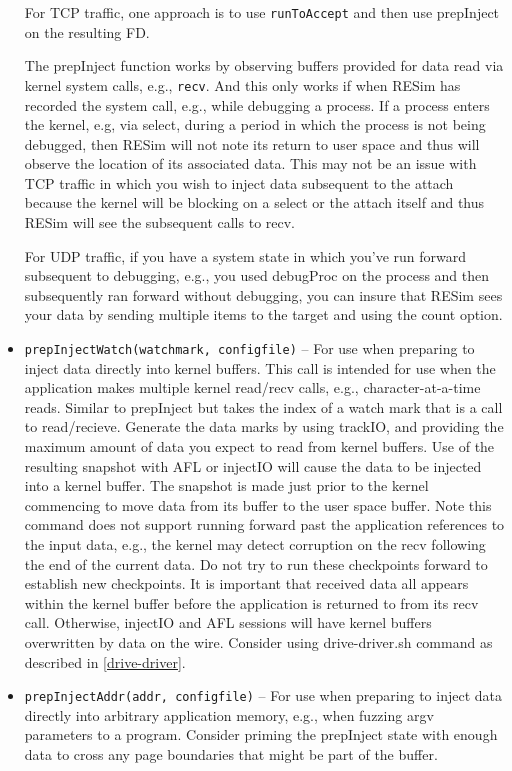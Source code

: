 \documentclass[titlepage]{article}
\begin{document}
\begin{itemize}
For TCP traffic, one approach is to use {\tt runToAccept} and then use prepInject on the resulting FD.

The prepInject function works by observing buffers provided for data read via kernel system calls, e.g., {\tt recv}.  And this only works if when RESim has recorded 
the system call, e.g., while debugging a process.
If a process enters the kernel, e.g, via select, during a period in which the process is not being debugged, then RESim will not note its return
to user space and thus will observe the location of its associated data.  This may not be an issue with TCP traffic in which you wish to inject data subsequent to
the attach because the kernel will be blocking on a select or the attach itself and thus RESim will see the subsequent calls to recv.

For UDP traffic, if you have a system state in which you've run forward subsequent to debugging, e.g., you used debugProc on the process and then subsequently ran forward without debugging,
you can insure that RESim sees your data by sending multiple items to the target and using the count option.

\item{\tt prepInjectWatch(watchmark, configfile)} -- For use when preparing to inject data directly into kernel buffers.  This call is intended for use when the application
makes multiple kernel read/recv calls, e.g., character-at-a-time reads.
Similar to prepInject but takes the index of a watch 
mark that is a call to read/recieve. Generate the data marks by using trackIO, and providing the maximum amount of data you expect to 
read from kernel buffers.
Use of the resulting snapshot with AFL or injectIO will cause the data to be injected
into a kernel buffer. The snapshot is made just prior to the kernel commencing to move data from its buffer to the user space buffer. 
Note this command does not support running forward past the application
references to the input data, e.g., the kernel may detect corruption on the recv following the end of the current data.
Do not try to run these checkpoints forward to establish new checkpoints.
It is important that received data all appears within the kernel buffer before the application is returned to from its recv call.  Otherwise, injectIO and AFL sessions
will have kernel buffers overwritten by data on the wire.  Consider using drive-driver.sh command as described in \ref{drive-driver}.

\item{\tt prepInjectAddr(addr, configfile)} -- For use when preparing to inject data directly into arbitrary application memory, e.g., when fuzzing argv parameters
to a program.  Consider priming the prepInject state with enough data to cross any page boundaries that might be part of the buffer.


\end{itemize}
\end{document}
